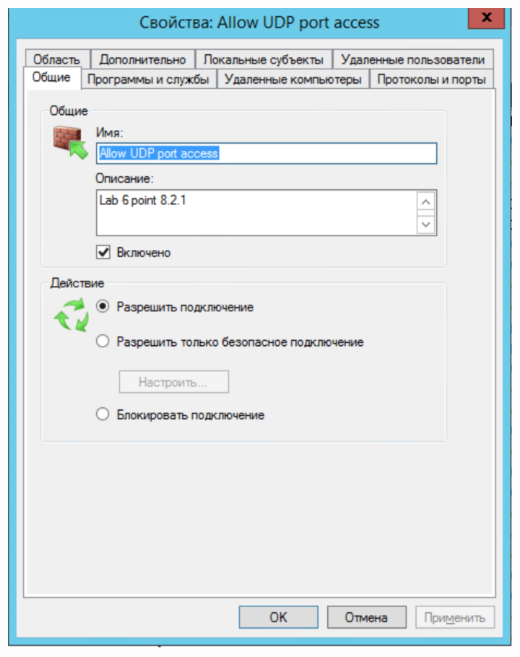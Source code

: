 \documentclass[a4paper,14pt]{extarticle}
\begin{document}
    \begin{center}
        \includegraphics[scale=0.7]{8.3.1.png}
    \end{center}
\end{document}
